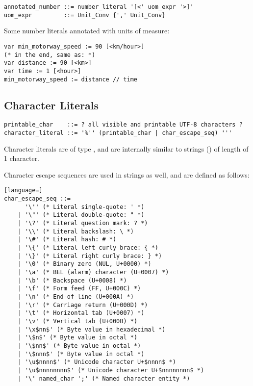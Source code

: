 \syntax\begin{lstlisting}
annotated_number ::= number_literal '[<' uom_expr '>]'
uom_expr         ::= Unit_Conv {',' Unit_Conv}
\end{lstlisting}

\example Some number literals annotated with units of measure:
\begin{lstlisting}
var min_motorway_speed := 90 [<km/hour>]
(* in the end, same as: *)
var distance := 90 [<km>]
var time := 1 [<hour>]
min_motorway_speed := distance // time
\end{lstlisting}






\subsection{Character Literals}
\label{sec:characterliterals}

\syntax\begin{lstlisting}
printable_char    ::= ? all visible and printable UTF-8 characters ? 
character_literal ::= '%'' (printable_char | char_escape_seq) '''
\end{lstlisting}

Character literals are of type , and are internally similar to strings () of length of 1 character. 

Character escape sequences are used in strings as well, and are defined as follows: 

\syntax\begin{lstlisting}[language=]
char_escape_seq ::= 
      '\'' (* Literal single-quote: ' *)
    | '\"' (* Literal double-quote: " *)
    | '\?' (* Literal question mark: ? *)
    | '\\' (* Literal backslash: \ *)
    | '\#' (* Literal hash: # *)
    | '\{' (* Literal left curly brace: { *)
    | '\}' (* Literal right curly brace: } *)
    | '\0' (* Binary zero (NUL, U+0000) *)
    | '\a' (* BEL (alarm) character (U+0007) *)
    | '\b' (* Backspace (U+0008) *)
    | '\f' (* Form feed (FF, U+000C) *)
    | '\n' (* End-of-line (U+000A) *)
    | '\r' (* Carriage return (U+000D) *)
    | '\t' (* Horizontal tab (U+0007) *)
    | '\v' (* Vertical tab (U+000B) *)
    | '\x$nn$' (* Byte value in hexadecimal *) 
    | '\$n$' (* Byte value in octal *)
    | '\$nn$' (* Byte value in octal *)
    | '\$nnn$' (* Byte value in octal *)
    | '\u$nnnn$' (* Unicode character U+$nnnn$ *)
    | '\u$nnnnnnnn$' (* Unicode character U+$nnnnnnnn$ *)
    | '\' named_char ';' (* Named character entity *)
\end{lstlisting}

